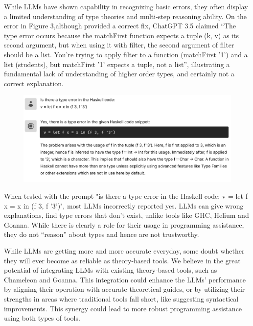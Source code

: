 While LLMs have shown capability in recognizing basic errors, they often display a limited understanding of type theories and multi-step reasoning ability. On the error in Figure 3,although provided a correct fix, ChatGPT 3.5 claimed “The type error occurs because the matchFirst function expects a tuple (k, v) as its second argument, but when using it with filter, the second argument of filter should be a list. You're trying to apply filter to a function (matchFirst '1') and a list (students), but matchFirst '1' expects a tuple, not a list”, illustrating a fundamental lack of understanding of higher order types, and certainly not a correct explanation.

\begin{figure}[hbt]
  \includegraphics[width=\linewidth]{LLM2}
  \caption{\label{fig:llm2}
    }
\end{figure}

When tested with the prompt "is there a type error in the Haskell code: v = let f x = x in (f 3, f '3')", most LLMs incorrectly reported yes. LLMs can give wrong explanations, find type errors that don't exist, unlike tools like GHC, Helium and Goanna. While there is clearly a role for their usage in programming assistance, they do not “reason” about types and hence are not trustworthy.

While LLMs are getting more and more accurate everyday, some doubt whether they will ever become as reliable as theory-based tools. We believe in the great potential of integrating LLMs with existing theory-based tools, such as Chameleon and Goanna. This integration could enhance the LLMs' performance by aligning their operation with accurate theoretical guides, or by utilizing their strengths in areas where traditional tools fall short, like suggesting syntactical improvements. This synergy could lead to more robust programming assistance using both types of tools.


